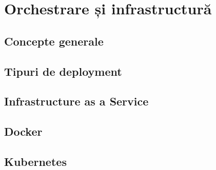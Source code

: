 \chapter{Orchestrare și infrastructură}
\label{orchestrare}
\section{Concepte generale}

\section{Tipuri de deployment}

\section{Infrastructure as a Service}

\section{Docker}

\section{Kubernetes}
